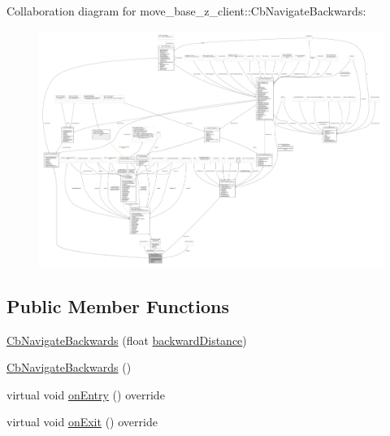 Collaboration diagram for move\+\_\+base\+\_\+z\+\_\+client\+:\+:Cb\+Navigate\+Backwards\+:
\nopagebreak
\begin{figure}[H]
\begin{center}
\leavevmode
\includegraphics[width=350pt]{classmove__base__z__client_1_1CbNavigateBackwards__coll__graph}
\end{center}
\end{figure}
\subsection*{Public Member Functions}
\begin{DoxyCompactItemize}
\item 
\hyperlink{classmove__base__z__client_1_1CbNavigateBackwards_a47e9482418fa6f26f7648b5e0d00800c}{Cb\+Navigate\+Backwards} (float \hyperlink{classmove__base__z__client_1_1CbNavigateBackwards_a53d06922eff285e4d35f4d7b1b7b7752}{backward\+Distance})
\item 
\hyperlink{classmove__base__z__client_1_1CbNavigateBackwards_a2536e2c30a2dbf13b19d08aca3539736}{Cb\+Navigate\+Backwards} ()
\item 
virtual void \hyperlink{classmove__base__z__client_1_1CbNavigateBackwards_a0338ce2154851a817642a698650b3d8d}{on\+Entry} () override
\item 
virtual void \hyperlink{classmove__base__z__client_1_1CbNavigateBackwards_a6046911372eedceeb2d29794a50a3443}{on\+Exit} () override
\end{DoxyCompactItemize}
